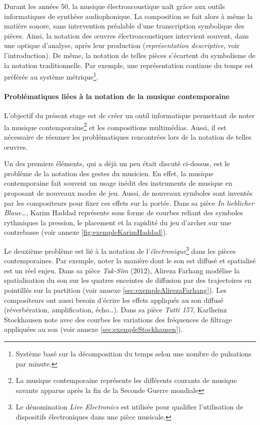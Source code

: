 Durant les années 50, la musique électroacoustique naît grâce aux outils informatiques de synthèse audiophonique. 
La composition se fait alors à même la matière sonore, sans intervention préalable d'une transcription symbolique des pièces.
Ainsi, la notation des œuvres électroacoustiques intervient souvent, dans une optique d'analyse, après leur production (\textit{représentation descriptive}, voir l'introduction).
De même, la notation de telles pièces s'écartent du symbolisme de la notation traditionnelle. Par exemple, une représentation continue du temps est préférée au système métrique\footnote{Système basé sur la décomposition du temps selon une nombre de pulsations par minute.}.

\paragraph{Problématiques liées à la notation de la musique contemporaine} L'objectif du présent stage est de créer un outil informatique permettant de noter la musique contemporaine\footnote{La musique contemporaine représente les différents courants de musique savante apparus après la fin de la Seconde Guerre mondiale} et les compositions multimédias. Aussi, il est nécessaire de résumer les problématiques rencontrées lors de la notation de telles œuvres. 

Un des premiers éléments, qui a déjà un peu était discuté ci-dessus, est le problème de la notation des gestes du musicien. En effet, la musique contemporaine fait souvent un usage inédit des instruments de musique en proposant de nouveaux modes de jeu. Aussi, de nouveaux symboles sont inventés par les compositeurs pour fixer ces effets sur la portée. Dans sa pièce \textit{In lieblicher Blaue…}, Karim Haddad représente sous forme de courbes reliant des symboles rythmiques la pression, le placement et la rapidité du jeu d'archer sur une contrebasse (voir annexe \ref{fig:exempleKarimHaddad}).

Le deuxième problème est lié à la notation de l'\textit{électronique}\footnote{Le dénomination \textit{Live Electronics} est utilisée pour qualifier l'utilisation de dispositifs électroniques dans une pièce musicale.} dans les pièces contemporaines. Par exemple, noter la manière dont le son est diffusé et spatialisé est un réel enjeu. Dans sa pièce \textit{Tak-Sîm} (2012), Alireza Farhang modélise la spatialisation du son sur les quatres enceintes de diffusion par des trajectoires en pointillés sur la partition (voir annexe \ref{sec:exempleAlirezaFarhang}).
Les compositeurs ont aussi besoin d'écrire les effets appliqués au son diffusé (réverbération, amplification, écho…). Dans sa pièce \textit{Tutti 157}, Karlheinz Stockhausen note avec des courbes les variations des fréquences de filtrage appliquées au son (voir annexe \ref{sec:exempleStockhausen}). 

